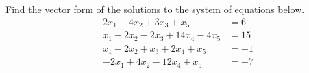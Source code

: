 Find the vector form of the solutions to the system of equations below.
%
\begin{align*}
2x_1-4x_2+3x_3+x_5&=6\\ 
x_1-2x_2-2x_3+14x_4-4x_5&=15\\ 
x_1-2x_2+x_3+2x_4+x_5&=-1\\ 
-2x_1+4x_2-12x_4+x_5&=-7
\end{align*}
